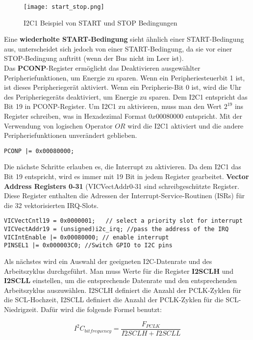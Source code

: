 \begin{figure}[!hb]
	\centering
	\texttt{[image: start\_stop.png]}
	\caption[I2C1 Beispiel von START und STOP Bedingungen]{I2C1 Beispiel von START und STOP Bedingungen}
	\label{fig:startstop}
\end{figure}

Eine \textbf{wiederholte START-Bedingung} sieht ähnlich einer START-Bedingung aus, unterscheidet sich jedoch von einer START-Bedingung, da sie vor einer STOP-Bedingung auftritt (wenn der Bus nicht im Leer ist).\\

Das \textbf{PCONP}-Register ermöglicht das Deaktivieren ausgewählter Peripheriefunktionen, um Energie zu sparen. Wenn ein Peripheriesteuerbit 1 ist, ist dieses Peripheriegerät aktiviert. Wenn ein Peripherie-Bit 0 ist, wird die Uhr des Peripheriegeräts deaktiviert, um Energie zu sparen. Dem I2C1 entspricht das Bit 19 in PCONP-Register. Um I2C1 zu aktivieren, muss man den Wert $2^{19}$ ins Register schreiben, was in Hexadezimal Format $0x00080000$ entspricht. Mit der Verwendung von logischen Operator $OR$ wird die I2C1 aktiviert und die andere Peripheriefunktionen unverändert geblieben.
\begin{lstlisting}
PCONP |= 0x00080000;
\end{lstlisting}
Die nächste Schritte erlauben es, die Interrupt zu aktivieren. Da dem I2C1 das Bit 19 entspricht, wird es immer mit 19 Bit in jedem Register gearbeitet. \textbf{Vector Address Registers 0-31} (VICVectAddr0-31 sind schreibgeschützte Register. Diese Register enthalten die Adressen der Interrupt-Service-Routinen (ISRs) für die 32 vektorisierten IRQ-Slots.
\begin{lstlisting}
VICVectCntl19 = 0x0000001;   // select a priority slot for interrupt
VICVectAddr19 = (unsigned)i2c_irq; //pass the address of the IRQ
VICIntEnable |= 0x00080000; // enable interrupt
PINSEL1 |= 0x000003C0; //Switch GPIO to I2C pins
\end{lstlisting}

Als nächstes wird ein Auswahl der geeigneten I2C-Datenrate und des Arbeitszyklus durchgeführt. Man muss Werte für die Register \textbf{I2SCLH} und \textbf{I2SCLL} einstellen, um die entsprechende Datenrate und den entsprechenden Arbeitszyklus auszuwählen. I2SCLH definiert die Anzahl der PCLK-Zyklen für die SCL-Hochzeit, I2SCLL definiert die Anzahl der PCLK-Zyklen für die SCL-Niedrigzeit. Dafür wird die folgende Formel benutzt:

\begin{equation}
I^2C_{bitfrequency} =  \frac{F_{PCLK}}{I2SCLH + I2SCLL }
\end{equation}\\


